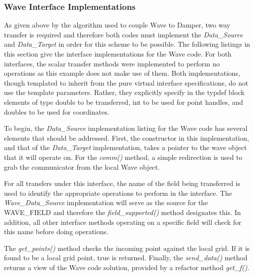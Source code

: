 \documentclass[letterpaper]{article}
\begin{document}
\subsubsection{Wave Interface Implementations}
As given above by the algorithm used to couple Wave to Damper, two way
transfer is required and therefore both codes must implement the {\sl
  Data\_Source} and {\sl Data\_Target} in order for this scheme to be
possible. The following listings in this section give the interface
implementations for the Wave code. For both interfaces, the scalar
transfer methods were implemented to perform no operations as this
example does not make use of them. Both implementations, though
templated to inherit from the pure virtual interface specifications,
do not use the template parameters. Rather, they explicitly specify in
the typdef block elements of type double to be transferred, int to be
used for point handles, and doubles to be used for coordinates.

To begin, the {\sl Data\_Source} implementation listing for the Wave
code has several elements that should be addressed. First, the
constructor in this implementation, and that of the {\sl Data\_Target}
implementation, takes a pointer to the wave object that it will
operate on. For the {\sl comm()} method, a simple redirection is used
to grab the communicator from the local Wave object. 

For all transfers under this interface, the name of the field being
transferred is used to identify the appropriate operations to perform
in the interface. The {\sl Wave\_Data\_Source} implementation will
serve as the source for the WAVE\_FIELD and therefore the {\sl
  field\_supported()} method designates this. In addition, all other
interface methods operating on a specific field will check for this
name before doing operations.

The {\sl get\_points()} method checks the incoming point against the
local grid. If it is found to be a local grid point, true is
returned. Finally, the {\sl send\_data()} method returns a view of the
Wave code solution, provided by a refactor method {\sl get\_f()}.
\end{document}
